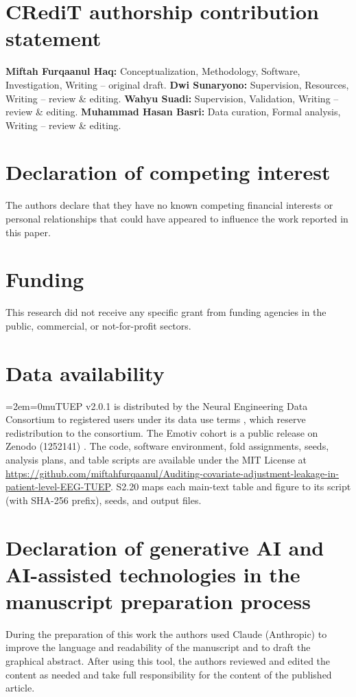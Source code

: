 \documentclass[final,1p,times]{elsarticle}
\begin{document}
\section*{CRediT authorship contribution statement}
\textbf{Miftah Furqaanul Haq:} Conceptualization, Methodology, Software, Investigation, Writing -- original draft. \textbf{Dwi Sunaryono:} Supervision, Resources, Writing -- review \& editing. \textbf{Wahyu Suadi:} Supervision, Validation, Writing -- review \& editing. \textbf{Muhammad Hasan Basri:} Data curation, Formal analysis, Writing -- review \& editing.

\section*{Declaration of competing interest}
The authors declare that they have no known competing financial interests or personal relationships that could have appeared to influence the work reported in this paper.

\section*{Funding}
This research did not receive any specific grant from funding agencies in the public, commercial, or not-for-profit sectors.

\section*{Data availability}
\begingroup\emergencystretch=2em\Urlmuskip=0mu\relax TUEP v2.0.1 is distributed by the Neural Engineering Data Consortium to registered users under its data use terms \cite{obeid2016,veloso2017}, which reserve redistribution to the consortium. The Emotiv cohort is a public release on Zenodo (1252141) \cite{vanhees2018}. The code, software environment, fold assignments, seeds, analysis plans, and table scripts are available under the MIT License at \url{https://github.com/miftahfurqaanul/Auditing-covariate-adjustment-leakage-in-patient-level-EEG-TUEP}. S2.20 maps each main-text table and figure to its script (with SHA-256 prefix), seeds, and output files.\par\endgroup

\section*{Declaration of generative AI and AI-assisted technologies in the manuscript preparation process}
During the preparation of this work the authors used Claude (Anthropic) to improve the language and readability of the manuscript and to draft the graphical abstract. After using this tool, the authors reviewed and edited the content as needed and take full responsibility for the content of the published article.%



\end{document}
